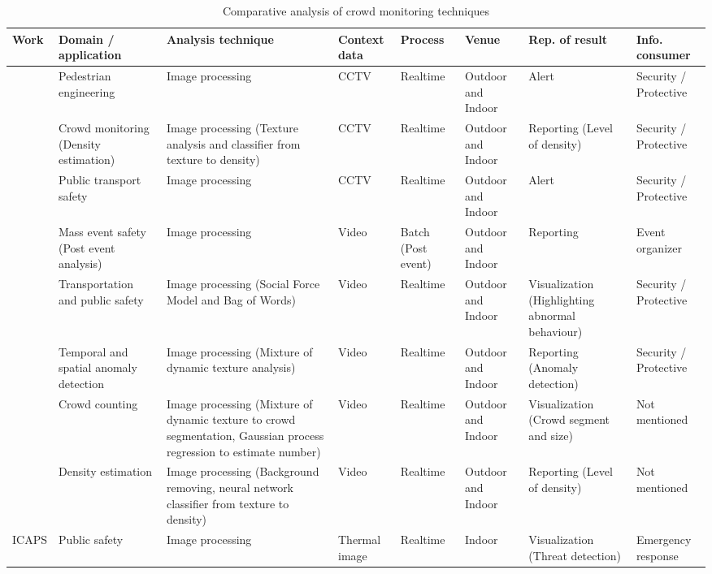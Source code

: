 \begin{center}
	\begin{longtable}{|p{1.8cm}|p{2cm}|p{2cm}|p{1.8cm}|p{1.3cm}|p{1.3cm}|}
		\caption{Comparative analysis of crowd monitoring techniques}
		\label{table:crowdMonitoringTechAnalysis} \\
		\hline
		\textbf{Work} & \textbf{Domain / application} & \textbf{Analysis technique} & \textbf{Context data} & \textbf{Process} & \textbf{Venue} & \textbf{Rep. of result} & \textbf{Info. consumer} \\
		\hline \hline
		\citet{Davies1995} & Pedestrian engineering & Image processing & CCTV & Realtime & Outdoor and Indoor & Alert & Security / Protective \\
		\hline
		\citet{Marana1997} & Crowd monitoring (Density estimation) & Image processing (Texture analysis and classifier from texture to density) & CCTV & Realtime & Outdoor and Indoor & Reporting (Level of density) & Security / Protective \\
		\hline
		\citet{Velastin1999} & Public transport safety & Image processing & CCTV & Realtime & Outdoor and Indoor & Alert & Security / Protective \\
		\hline
		\citet{Johansson2008} & Mass event safety (Post event analysis) & Image processing & Video & Batch (Post event) & Outdoor and Indoor & Reporting & Event organizer \\
		\hline
		\citet{Mehran2009} & Transportation and public safety & Image processing (Social Force Model and Bag of Words) & Video & Realtime & Outdoor and Indoor & Visualization (Highlighting abnormal behaviour) & Security / Protective \\
		\hline
		\citet{Mahadevan2010} & Temporal and spatial anomaly detection & Image processing (Mixture of dynamic texture analysis) & Video & Realtime & Outdoor and Indoor & Reporting (Anomaly detection) & Security / Protective \\
		\hline
		\citet{Chan2008} & Crowd counting & Image processing (Mixture of dynamic texture to crowd segmentation, Gaussian process regression to estimate number) & Video & Realtime & Outdoor and Indoor & Visualization (Crowd segment and size) & Not mentioned \\
		\hline
		\citet{Li2010} & Density estimation & Image processing (Background removing, neural network classifier from texture to density) & Video & Realtime & Outdoor and Indoor & Reporting (Level of density) & Not mentioned \\
		\hline
		ICAPS \citep{Pham2007} & Public safety & Image processing & Thermal image & Realtime & Indoor & Visualization (Threat detection) & Emergency response \\

\end{longtable}
\end{center}
